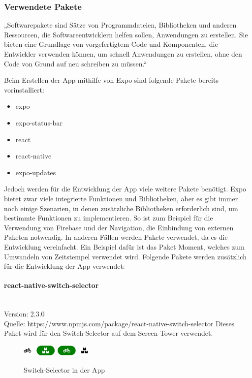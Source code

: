 \subsubsection{Verwendete Pakete}
„Softwarepakete sind Sätze von Programmdateien, Bibliotheken und anderen Ressourcen, die Softwareentwicklern helfen sollen, Anwendungen zu erstellen. Sie bieten eine Grundlage von vorgefertigtem Code und Komponenten, die Entwickler verwenden können, um schnell Anwendungen zu erstellen, ohne den Code von Grund auf neu schreiben zu müssen.“ 

\bigskip


Beim Erstellen der App mithilfe von Expo sind folgende Pakete bereits vorinstalliert:
\begin{itemize}
  \item expo
  \item expo-status-bar
  \item react
  \item react-native
  \item expo-updates
\end{itemize}

\noindent Jedoch werden für die Entwicklung der App viele weitere Pakete benötigt. Expo bietet zwar viele integrierte Funktionen und Bibliotheken, aber es gibt immer noch einige Szenarien, in denen zusätzliche Bibliotheken erforderlich sind, um bestimmte Funktionen zu implementieren.
\noindent So ist zum Beispiel für die Verwendung von Firebase und der Navigation, die Einbindung von externen Paketen notwendig.
\noindent In anderen Fällen werden Pakete verwendet, da es die Entwicklung vereinfacht. Ein Beispiel dafür ist das Paket Moment, welches zum Umwandeln von Zeitstempel verwendet wird.
\noindent Folgende Pakete werden zusätzlich für die Entwicklung der App verwendet:


\paragraph{react-native-switch-selector}\mbox{}\\
Version: 2.3.0\\ Quelle: https://www.npmjs.com/package/react-native-switch-selector
\bigskip
Dieses Paket wird für den \Gls{Switch-Selector} auf dem Screen Tower verwendet.
\begin{figure}[H]
  \centering
  \includegraphics[width=0.15\textwidth]{images/app-screenshots/switchselector.png}
  \includegraphics[width=0.15\textwidth]{images/app-screenshots/switchselector2.png}
  \caption{Switch-Selector in der App}
  \label{fig:switchselector}
\end{figure}

